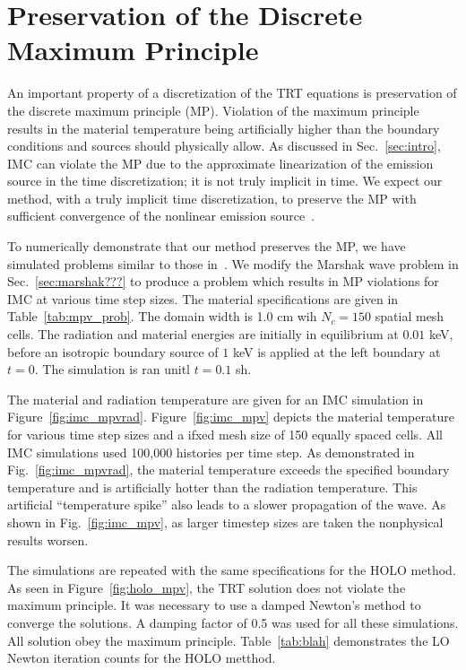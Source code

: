 
\section{Preservation of the Discrete Maximum Principle}

An important property of a discretization of the TRT equations is preservation of the
discrete maximum principle (MP).  Violation of the maximum principle results in
the material temperature being artificially higher than the boundary conditions and
sources should physically allow. As discussed in Sec.~\ref{sec:intro}, IMC can violate the MP due to the approximate
linearization of the emission source in the time discretization; it is not truly implicit in time. 
We expect our
method, with a truly implicit time discretization, to preserve the MP with sufficient
convergence of the nonlinear emission source~\cite{larsen_mpv}.

To numerically demonstrate that our method preserves the MP, we have simulated problems similar to those in~\cite{wollaber2013discrete}.
We modify the Marshak wave problem in Sec.~\ref{sec:marshak???} to produce a problem which
results in MP violations for IMC at various time step sizes.  The material specifications
are given in Table~\ref{tab:mpv_prob}. The domain width is 1.0 cm wih $N_c=150$ spatial mesh cells.  The radiation and material energies are initially in
equilibrium at $0.01$ keV, before an isotropic boundary source of $1$ keV is applied at
the left boundary at $t=0$. The simulation is ran unitl $t=0.1$ sh. 

The material and radiation temperature are given for an IMC simulation in Figure~\ref{fig:imc_mpvrad}.  Figure~\ref{fig:imc_mpv} depicts the material temperature for various time step sizes and a ifxed
mesh size of 150 equally spaced cells. All IMC simulations used 100,000 histories per time
step. As demonstrated in Fig.~\ref{fig:imc_mpvrad}, the material temperature exceeds the
specified boundary temperature and is artificially hotter than the radiation temperature.
This artificial ``temperature spike'' also leads to a slower propagation of the wave.
As shown in Fig.~\ref{fig:imc_mpv}, as larger timestep sizes are taken the nonphysical results worsen.

The simulations are repeated with the same specifications for the HOLO method. As seen in
Figure~\ref{fig:holo_mpv}, the TRT solution does not violate the maximum principle. It was
necessary to use a damped Newton's method to converge the solutions.  A damping factor of
0.5 was used for all these simulations.  All solution obey the maximum principle.
Table~\ref{tab:blah} demonstrates the LO Newton iteration counts for the HOLO metthod.





